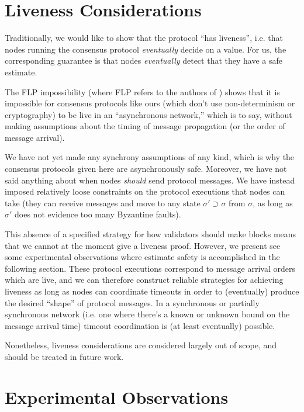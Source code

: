 \documentclass{article}
\theoremstyle{definition}
\begin{document}
\section{Liveness Considerations}

Traditionally, we would like to show that the protocol ``has liveness'', i.e. that nodes running the consensus protocol \emph{eventually} decide on a value. For us, the corresponding guarantee is that nodes \emph{eventually} detect that they have a safe estimate.

The FLP impossibility (where FLP refers to the authors of \cite{Fischer_Lynch_Paterson_FLP_Impossibility_1985}) shows that it is impossible for consensus protocols like ours (which don't use non-determinism or cryptography) to be live in an ``asynchronous network,'' which is to say, without making assumptions about the timing of message propagation (or the order of message arrival).

We have not yet made any synchrony assumptions of any kind, which is why the consensus protocols given here are asynchronously safe. Moreover, we have not said anything about when nodes \emph{should} send protocol messages. We have instead imposed relatively loose constraints on the protocol executions that nodes can take (they can receive messages and move to any state $\sigma' \supset \sigma$ from $\sigma$, as long as $\sigma'$ does not evidence too many Byzantine faults).

This absence of a specified strategy for how validators should make blocks means that we cannot at the moment give a liveness proof. However, we present see some experimental observations where estimate safety is accomplished in the following section. These protocol executions correspond to message arrival orders which are live, and we can therefore construct reliable strategies for achieving liveness as long as nodes can coordinate timeouts in order to (eventually) produce the desired ``shape'' of protocol messages. In a synchronous or partially synchronous network (i.e. one where there's a known or unknown bound on the message arrival time) timeout coordination is (at least eventually) possible.

Nonetheless, liveness considerations are considered largely out of scope, and should be treated in future work.

\pagebreak
\section{Experimental Observations}
\end{document}

